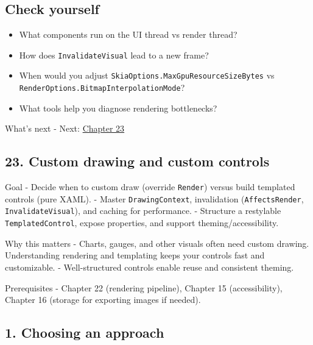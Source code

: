 \subsection{Check yourself}\label{check-yourself-20}

\begin{itemize}
\tightlist
\item
  What components run on the UI thread vs render thread?
\item
  How does \passthrough{\lstinline!InvalidateVisual!} lead to a new
  frame?
\item
  When would you adjust
  \passthrough{\lstinline!SkiaOptions.MaxGpuResourceSizeBytes!} vs
  \passthrough{\lstinline!RenderOptions.BitmapInterpolationMode!}?
\item
  What tools help you diagnose rendering bottlenecks?
\end{itemize}

What's next - Next: \href{Chapter23.md}{Chapter 23}

\newpage

\subsection{23. Custom drawing and custom
controls}\label{custom-drawing-and-custom-controls}

Goal - Decide when to custom draw (override
\passthrough{\lstinline!Render!}) versus build templated controls (pure
XAML). - Master \passthrough{\lstinline!DrawingContext!}, invalidation
(\passthrough{\lstinline!AffectsRender!},
\passthrough{\lstinline!InvalidateVisual!}), and caching for
performance. - Structure a restylable
\passthrough{\lstinline!TemplatedControl!}, expose properties, and
support theming/accessibility.

Why this matters - Charts, gauges, and other visuals often need custom
drawing. Understanding rendering and templating keeps your controls fast
and customizable. - Well-structured controls enable reuse and consistent
theming.

Prerequisites - Chapter 22 (rendering pipeline), Chapter 15
(accessibility), Chapter 16 (storage for exporting images if needed).

\subsection{1. Choosing an approach}\label{choosing-an-approach}


